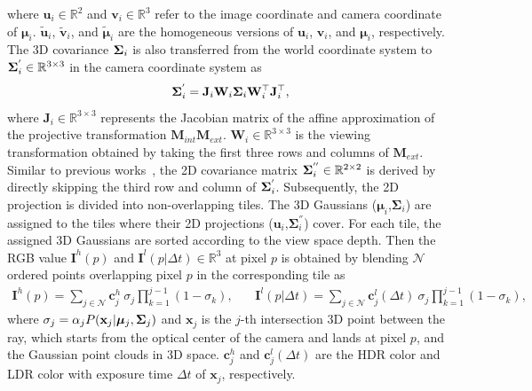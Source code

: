 \documentclass{article}
\begin{document}
where $\mathbf{u}_i \in \mathbb{R}^{2}$ and $\mathbf{v}_{i} \in \mathbb{R}^3$ refer to the image coordinate and camera coordinate of $\bm{\mu}_{i}$. $\widetilde{\mathbf{u}}_i$, $\widetilde{\mathbf{v}}_i$, and $ \widetilde{\bm{\mu}}_i$ are the homogeneous versions of $\mathbf{u}_i$, $\mathbf{v}_{i}$, and $\bm{\mu}_{i}$, respectively. The 3D covariance  $\mathrm{\bf \Sigma}_i$ is also transferred from the world coordinate system to $\mathrm{\bf \Sigma}_i^{'} \in \mathbb{R}^{3\times 3}$ in the camera coordinate system as
\begin{equation}
	\mathrm{\bf \Sigma}_i^{'} = \mathbf{J}_i \mathbf{W}_i \mathrm{\bf \Sigma}_i \mathbf{W}_i^\top \mathbf{J}_i^\top, 
\end{equation}
where $\mathbf{J}_i \in \mathbb{R}^{3\times 3}$ represents the Jacobian matrix of the affine approximation of the projective transformation $\mathbf{M}_{int}\mathbf{M}_{ext}$. $\mathbf{W}_i \in \mathbb{R}^{3\times 3}$ is the viewing transformation obtained by taking the first three rows and columns of $\mathbf{M}_{ext}$. Similar to previous works~\cite{ewa,kopanas2021point,3dgs,x_gaussian}, the 2D covariance matrix $\mathrm{\bf \Sigma}_i^{''} \in \mathbb{R}^{2\times2}$ is derived by directly skipping the third row and column of $\mathrm{\bf \Sigma}_i^{'}$. Subsequently, the 2D projection is divided into non-overlapping tiles. The 3D Gaussians ($\bm{\mu}_i$,$\bm{\mathbf{\Sigma}}_i$) are assigned to the tiles where their 2D projections ($\bm{u}_i$,$\bm{\mathbf{\Sigma}}^{''}_i$) cover. For each tile, the assigned 3D Gaussians are sorted according to the view space depth. Then the RGB value $\mathbf{I}^{h}(p)$ and $\mathbf{I}^{l}(p | \Delta t) \in \mathbb{R}^3$ at pixel $p$ is obtained by blending $\mathcal{N}$ ordered points overlapping pixel $p$ in the corresponding tile as
\begin{equation}
\begin{aligned}
	\mathbf{I}^{h}(p) = \sum_{j \in \mathcal{N}} \bm{c}_j^h~\sigma_j  \prod_{k=1}^{j-1}(1-\sigma_k), ~~~~~~~~ \mathbf{I}^{l}(p | \Delta t) = \sum_{j \in \mathcal{N}} \bm{c}_j^l(\Delta t)~\sigma_j  \prod_{k=1}^{j-1}(1-\sigma_k),
\end{aligned}
\end{equation}
where $\sigma_j = \alpha_j P(\mathbf{x}_j | \bm{\mu}_j, \mathrm{\bf \Sigma}_j)$ and $\mathbf{x}_j$ is the $j$-th intersection 3D point between the ray, which starts from the optical center of the camera and lands at pixel $p$, and the Gaussian point clouds in 3D space. $\bm{c}_j^h$ and $\bm{c}_j^l (\Delta t)$ are the HDR color and LDR color with exposure time $\Delta t$ of $\mathbf{x}_j$, respectively.
\end{document}
